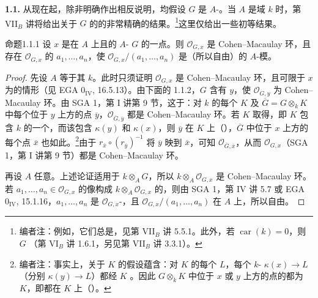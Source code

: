 \textbf{1.1.} 从现在起，除非明确作出相反说明，均假设 $G$ 是 $A$-。当 $A$ 是域 $k$ 时，第 VII$_B$ 讲将给出关于 $G$ 的的非常精确的结果。\footnote{编者注：例如，它们总是，见第 VII$_B$ 讲 5.5.1。此外，若 $\operatorname{car}(k)=0$，则 $G$ （第 VI$_B$ 讲 1.6.1，另见第 VII$_B$ 讲 3.3.1）。}这里仅给出一些初等结果。
\begin{SGAresult}{命题}{1.1.1}
设 $x$ 是在 $A$ 上且的 $A$- $G$ 的一点。则 $\mathcal O_{G,x}$ 是 Cohen--Macaulay 环，且存在 $\mathcal O_{G,x}$ 的 $a_1,\ldots,a_n$，使 $\mathcal O_{G,x}/(a_1,\ldots,a_n)$ 是（所以自由）的 $A$-模。
\end{SGAresult}
\begin{proof}
先设 $A$ 等于其 $k$。此时只须证明 $\mathcal O_{G,x}$ 是 Cohen--Macaulay 环，且可限于 $x$ 为的情形（见 EGA $0_{\mathrm{IV}}$, 16.5.13）。由下面的 1.1.2，$G$ 含有 $y$，使 $\mathcal O_{G,y}$ 为 Cohen--Macaulay 环。由 SGA 1，第 I 讲第 9 节，这于：对 $k$ 的每个 $K$ 及 $\overline G=G\otimes_k K$ 中每个位于 $y$ 上方的点 $\overline y$，$\mathcal O_{\overline G,\overline y}$ 都是 Cohen--Macaulay 环。若 $K$ 取得，即 $K$ 包含 $k$ 的一个，而该包含 $\kappa(y)$ 和 $\kappa(x)$，则 $\overline y$ 在 $K$ 上（），$\overline G$ 中位于 $x$ 上方的每个点 $\overline x$ 也如此。\footnote{编者注：事实上，关于 $K$ 的假设蕴含：对 $K$ 的每个 $L$，每个 $k$- $\kappa(x)\to L$（分别 $\kappa(y)\to L$）都经 $K$ 。因此 $G\otimes_k K$ 中位于 $x$ 或 $y$ 上方的点的都为 $K$，即都在 $K$ 上（）。}由于 $r_{\overline x}\circ(r_{\overline y})^{-1}$ 将 $\overline y$ 映到 $\overline x$，可知 $\mathcal O_{\overline G,\overline x}$，从而 $\mathcal O_{G,x}$（SGA 1，第 I 讲第 9 节）都是 Cohen--Macaulay 环。

再设 $A$ 任意。上述论证适用于 $k\otimes_A G$，所以 $k\otimes_A\mathcal O_{G,x}$ 是 Cohen--Macaulay 环。若 $a_1,\ldots,a_n\in\mathcal O_{G,x}$ 的像构成 $k\otimes_A\mathcal O_{G,x}$ 的，则由 SGA 1，第 IV 讲 5.7 或 EGA $0_{\mathrm{IV}}$, 15.1.16，$a_1,\ldots,a_n$ 是 $\mathcal O_{G,x}$-，且 $\mathcal O_{G,x}/(a_1,\ldots,a_n)$ 在 $A$ 上，所以自由。
\end{proof}
